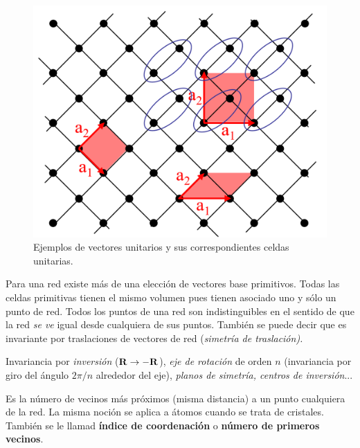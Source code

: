 \begin{figure}[h!] \centering
    \includegraphics[scale=0.6]{Cuerpo/Ch_01/celda.png}
    \caption{Ejemplos de vectores unitarios y sus correspondientes celdas unitarias.}
    \label{Fig:01-01}
\end{figure}


\begin{definition}
    Para una red existe más de una elección de vectores base primitivos. Todas las celdas primitivas tienen el mismo volumen pues tienen asociado uno y sólo un punto de red. Todos los puntos de una red son indistinguibles en el sentido de que la red {\it se ve} igual desde cualquiera de sus puntos. También se puede decir que es invariante por traslaciones de vectores de red (\it{simetría de traslación}).          
\end{definition}

\begin{definition}
    Invariancia por {\it inversión} ($\mathbf{R} \rightarrow - \mathbf{R}$), {\it eje de rotación} de orden $n$ (invariancia por giro del ángulo $2\pi/n$ alrededor del eje), {\it planos de simetría, centros de inversión}...    
\end{definition}

\begin{definition}
    Es la número de vecinos más próximos (misma distancia) a un punto cualquiera de la red. La misma noción se aplica a átomos cuando se trata de cristales. También se le llamad \textbf{índice de coordenación} o \textbf{número de primeros vecinos}.
\end{definition}

